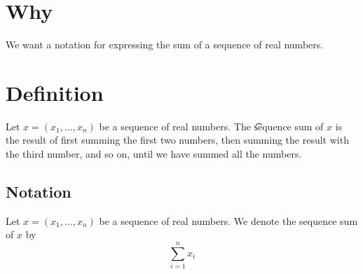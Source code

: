 

\section*{Why}

We want a notation for expressing the sum of a sequence of real numbers.

\section*{Definition}

Let $x = (x_1, \dots , x_n)$ be a sequence of real numbers.
The \t{sequence sum} of $x$ is the result of first summing the first two numbers, then summing the result with the third number, and so on, until we have summed all the numbers.

\subsection*{Notation}

Let $x = (x_1, \dots , x_n)$ be a sequence of real numbers.
We denote the sequence sum of $x$ by
    \[
\sum_{i = 1}^{n} x_i
    \]

\blankpage